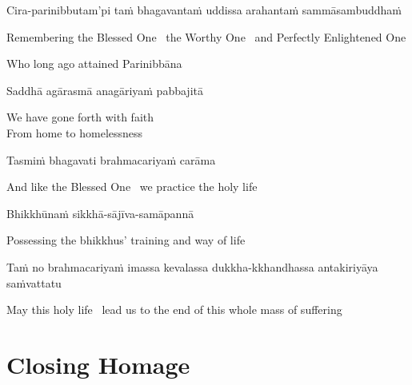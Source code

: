 \begin{pali-hang}
  Cira-parinibbutam'pi taṁ bhagavantaṁ uddissa arahantaṁ sammāsambuddhaṁ
\end{pali-hang}

\begin{english-hang}
  Remembering the Blessed One \breathmark\ the Worthy One \breathmark\ and Perfectly Enlightened One\\
\end{english-hang}

\begin{english}
  Who long ago attained Parinibbāna
\end{english}

Saddhā agārasmā anagāriyaṁ pabbajitā

\begin{english}
  We have gone forth with faith\\
  From home to homelessness
\end{english}

Tasmiṁ bhagavati brahmacariyaṁ carāma

\begin{english}
  And like the Blessed One \breathmark\ we practice the holy life
\end{english}

Bhikkhūnaṁ sikkhā-sājīva-samāpannā

\begin{english}
  Possessing the bhikkhus' training and way of life\ifdigitalversion\makeatletter\hyperlink{endnote28-appendix}\makeatother\fi
\end{english}

\begin{pali-hang}
  Taṁ no brahmacariyaṁ imassa kevalassa dukkha-kkhandhassa antakiriyāya saṁvattatu
\end{pali-hang}

\begin{english}
  May this holy life \breathmark\ lead us to the end of this whole mass of suffering
\end{english}

\suttaRef{[Thai]}


\section{Closing Homage}
\label{closing-homage}

